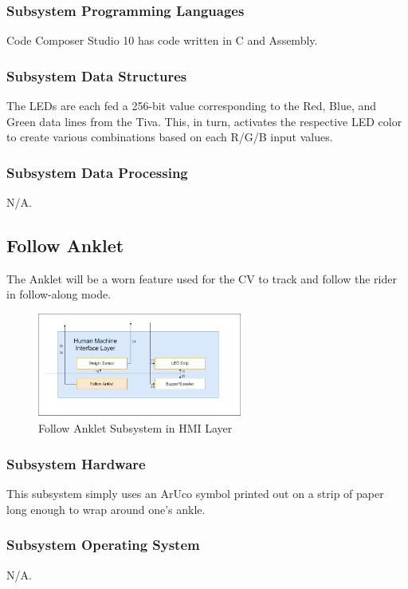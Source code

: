 \subsubsection{Subsystem Programming Languages}
Code Composer Studio 10 has code written in C and Assembly.

\subsubsection{Subsystem Data Structures}
The LEDs are each fed a 256-bit value corresponding to the Red, Blue, and Green data lines from the Tiva. This, in turn, activates the respective LED color to create various combinations based on each R/G/B input values.

\subsubsection{Subsystem Data Processing}
N/A.

\subsection{Follow Anklet}
The Anklet will be a worn feature used for the CV to track and follow the rider in follow-along mode.

\begin{figure}[h!]
	\centering
 	\includegraphics[width=0.60\textwidth]{images/Kendall/Anklet.png}
 \caption{Follow Anklet Subsystem in HMI Layer}
\end{figure}

\subsubsection{Subsystem Hardware}
This subsystem simply uses an ArUco symbol printed out on a strip of paper long enough to wrap around one's ankle.

\subsubsection{Subsystem Operating System}
N/A.

